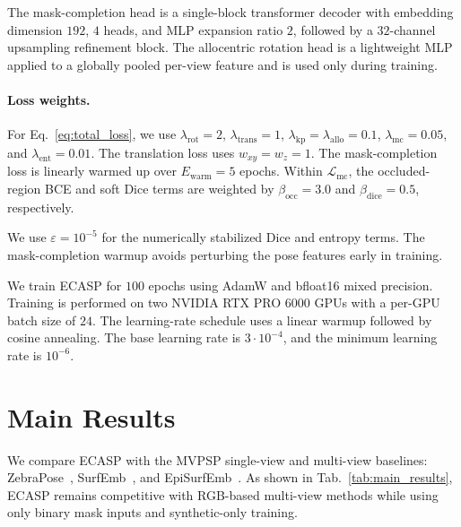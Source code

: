 
The mask-completion head is a single-block transformer decoder with
embedding dimension \(192\), \(4\) heads, and MLP expansion ratio \(2\),
followed by a \(32\)-channel upsampling refinement block. The allocentric
rotation head is a lightweight MLP applied to a globally pooled per-view
feature and is used only during training.

\paragraph{Loss weights.}
For Eq.~\ref{eq:total_loss}, we use
\(\lambda_{\mathrm{rot}}=2\),
\(\lambda_{\mathrm{trans}}=1\),
\(\lambda_{\mathrm{kp}}=\lambda_{\mathrm{allo}}=0.1\),
\(\lambda_{\mathrm{mc}}=0.05\), and
\(\lambda_{\mathrm{ent}}=0.01\).
The translation loss uses \(w_{xy}=w_z=1\).
The mask-completion loss is linearly warmed up over \(E_{\mathrm{warm}}=5\) epochs.
Within \(\mathcal{L}_{\mathrm{mc}}\), the occluded-region BCE and soft Dice terms are weighted by \(\beta_{\mathrm{occ}}=3.0\) and \(\beta_{\mathrm{dice}}=0.5\), respectively.


We use \(\varepsilon=10^{-5}\) for the numerically stabilized Dice and
entropy terms. The mask-completion warmup avoids perturbing the pose features
early in training.


\label{supp:training}
We train ECASP for \(100\) epochs using AdamW and bfloat16 mixed precision.
Training is performed on two NVIDIA RTX PRO 6000 GPUs with a
per-GPU batch size of \(24\). The learning-rate schedule uses a linear
warmup followed by cosine annealing. The base learning rate is
\(3\cdot10^{-4}\), and the minimum learning rate is \(10^{-6}\).

\section{Main Results}
\label{sec:main_results}
We compare ECASP with the MVPSP single-view and multi-view baselines:
ZebraPose~\cite{su2022zebrapose}, SurfEmb~\cite{haugaard2022surfemb},
and EpiSurfEmb~\cite{haugaard2023episurfemb}.
As shown in Tab.~\ref{tab:main_results}, ECASP remains competitive with RGB-based multi-view methods while using only binary mask inputs and synthetic-only training.

